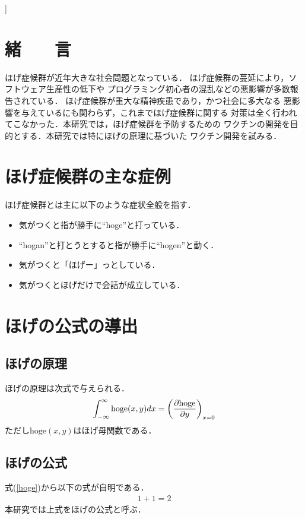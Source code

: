 ]
\begin{small}
\section{緒　　言}
ほげ症候群が近年大きな社会問題となっている\cite{Ikuo:doctor}．
ほげ症候群の蔓延により，ソフトウェア生産性の低下や
プログラミング初心者の混乱などの悪影響が多数報告されている．
ほげ症候群が重大な精神疾患であり，かつ社会に多大なる
悪影響を与えているにも関わらず，これまでほげ症候群に関する
対策は全く行われてこなかった．本研究では，ほげ症候群を予防するための
ワクチンの開発を目的とする．本研究では特にほげの原理に基づいた
ワクチン開発を試みる．
\section{ほげ症候群の主な症例}
ほげ症候群とは主に以下のような症状全般を指す\cite{Hondo:hohoge2006}．
\begin{itemize}
\item 気がつくと指が勝手に``hoge''と打っている．
\item ``hogan''と打とうとすると指が勝手に``hogen''と動く．
\item 気がつくと「ほげー」っとしている．
\item 気がつくとほげだけで会話が成立している．
\end{itemize}
\section{ほげの公式の導出}
\subsection{ほげの原理}
ほげの原理は次式で与えられる\cite{Kawamura:hogege2010}．
\begin{eqnarray}
\int_{-\infty}^\infty \mathrm{hoge}(x,y) dx = \left( \frac{\partial \mathrm{hoge}}{\partial y} \label{hoge} \right)_{x = 0}
\end{eqnarray}
ただし$\mathrm{hoge}(x,y)$はほげ母関数である．
\subsection{ほげの公式}
式(\ref{hoge})から以下の式が自明である．
\begin{eqnarray}
1 + 1 = 2
\end{eqnarray}
本研究では上式をほげの公式と呼ぶ．

\end{small}
